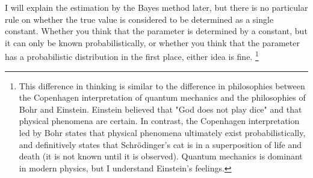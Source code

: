 \documentclass{ltjsbook}
\begin{document}
I will explain the estimation by the Bayes method later, but there is no particular rule on whether the true value is considered to be determined as a single constant. Whether you think that the parameter is determined by a constant, but it can only be known probabilistically, or whether you think that the parameter has a probabilistic distribution in the first place, either idea is fine.
\footnote{This difference in thinking is similar to the difference in philosophies between the Copenhagen interpretation of quantum mechanics and the philosophies of Bohr and Einstein. Einstein believed that "God does not play dice" and that physical phenomena are certain. In contrast, the Copenhagen interpretation led by Bohr states that physical phenomena ultimately exist probabilistically, and definitively states that Schrödinger's cat is in a superposition of life and death (it is not known until it is observed). Quantum mechanics is dominant in modern physics, but I understand Einstein's feelings.}
\end{document}
